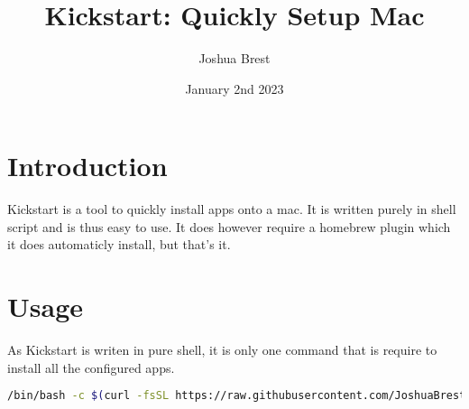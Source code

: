 \documentclass[12pt]{article}
\title{Kickstart: Quickly Setup Mac}
\author{Joshua Brest}
\date{January 2nd 2023}
\begin{document}
    \maketitle

    \section{Introduction}

    Kickstart is a tool to quickly install apps onto a mac. It is written purely in shell script and is thus easy to use. It does however require a homebrew plugin which it does automaticly install, but that's it.
    
    \section{Usage}
        As Kickstart is writen in pure shell, it is only one command that is require to install all the configured apps.
        \begin{lstlisting}[language=bash]
/bin/bash -c $(curl -fsSL https://raw.githubusercontent.com/JoshuaBrest/kickstart/HEAD/kick.sh)
        \end{lstlisting}
\end{document}
